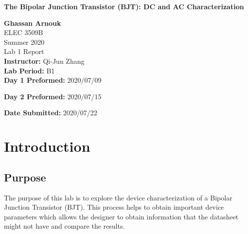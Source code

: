 \documentclass{article}
\begin{document}
	\begin{titlepage}
		\begin{center}
			\vspace{1cm}
			{\LARGE\textbf{The Bipolar Junction Transistor (BJT): DC and AC Characterization}}

			\vspace{1.5cm}
			\textbf{\large Ghassan Arnouk}\\
			
			\vspace{1cm}
			\large ELEC 3509B\\
			\large Summer 2020\\
			\large Lab 1 Report\\
			
						
			\vspace{2cm}
			\textbf{Instructor:} Qi-Jun Zhang\\
						
			
			\vspace{1cm}
			\textbf{Lab Period:} B1\\
			
			\vspace{0.1cm}
			\textbf{Day 1 Preformed:} 2020/07/09
			
			\vspace{0.1cm}
			\textbf{Day 2 Preformed:} 2020/07/15
			
			\vspace{1cm}
			\textbf{Date Submitted:} 2020/07/22\\			
		\end{center}
	\end{titlepage}

	\pagebreak
	
	\tableofcontents
	\pagebreak
		
	\listoftables
	\pagebreak
	
	\listoffigures
	\pagebreak
	
	\section{Introduction}
	\subsection{Purpose}
	The purpose of this lab is to explore the device characterization of a Bipolar Junction Transistor (BJT).
	This process helps to obtain important device parameters which allows the designer to obtain information that the datasheet might not have and compare the results.
	
\end{document}
